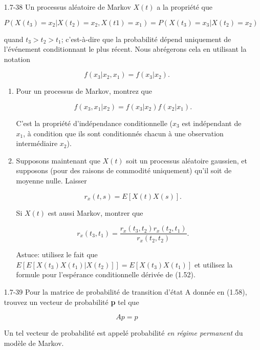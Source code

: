 \documentclass[10pt,twoside,a4paper]{book}
\begin{document}
\begin{enumerate}
  \item[1.7-38] Un processus aléatoire de Markov $X(t)$ a la propriété que
  
  \begin{equation*}
    P(X(t_3) = x_2|X(t_2) = x_2, X(t1) = x_1) = P(X(t_3) = x_3|X(t_2) = x_2)
  \end{equation*}

  \noindent
  quand $t_3>t_2>t_1$; c'est-à-dire que la probabilité dépend uniquement de l'événement conditionnant le plus récent. Nous abrégerons cela en utilisant la notation

  \begin{equation*}
    f(x_3|x_2, x_1) = f(x_3|x_2).
  \end{equation*}

  \begin{enumerate}
    \item Pour un processus de Markov, montrez que
    
    \begin{equation*}
      f(x_3, x_1|x_2) = f(x_3|x_2)f(x_2|x_1).
    \end{equation*}

    \noindent
    C'est la propriété d'indépendance conditionnelle ($x_3$ est indépendant de $x_1$, à condition que ils sont conditionnés chacun à une observation intermédiaire $x_2$).
    
    \item Supposons maintenant que $X(t)$ soit un processus aléatoire gaussien, et supposons (pour des raisons de commodité uniquement) qu'il soit de moyenne nulle. Laisser
    
    \begin{equation*}
      r_x(t,s) = E[X(t)X(s)].
    \end{equation*}

    \noindent
    Si $X(t)$ est aussi Markov, montrer que

    \begin{equation*}
      r_x(t_3,t_1) = \frac{r_x(t_3,t_2)r_x(t_2,t_1)}{r_x(t_2,t_2)}.
    \end{equation*}

    \noindent
    Astuce: utilisez le fait que $E[E[X(t_3)X(t_1)|X(t_2)]] = E[X(t_3)X(t_1)]$ et utilisez la formule pour l'espérance conditionnelle dérivée de (1.52).
  \end{enumerate}

  \item[1.7-39] Pour la matrice de probabilité de transition d'état A donnée en (1.58), trouvez un vecteur de probabilité \textbf{p} tel que
  
  \begin{equation*}
    Ap=p
  \end{equation*}

  \noindent
  Un tel vecteur de probabilité est appelé probabilité \textit{en régime permanent} du modèle de Markov.
\end{enumerate}
\end{document}
